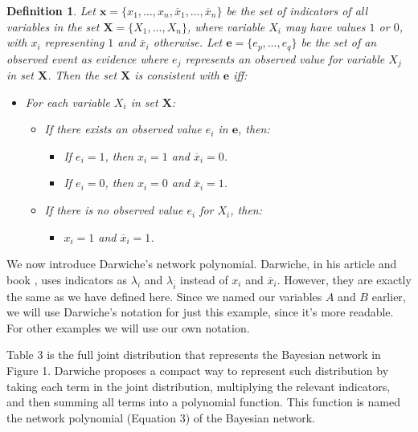 \documentclass[a4paper,10pt]{article}
\theoremstyle{plain}
\newtheorem*{spn-def}{Definition}
\begin{document}
\begin{spn-def}
  Let $\mathbf{x}=\{x_1,\ldots,x_n,\overline{x}_1,\ldots,\overline{x}_n\}$ be the set of indicators
  of all variables in the set $\mathbf{X}=\{X_1,\ldots,X_n\}$, where variable $X_i$ may have values
  $1$ or $0$, with $x_i$ representing $1$ and $\overline{x}_i$ otherwise. Let $\mathbf{e}=\{e_p,
  \ldots,e_q\}$ be the set of an observed event as evidence where $e_j$ represents an observed
  value for variable $X_j$ in set $\mathbf{X}$. Then the set $\mathbf{X}$ is consistent with
  $\mathbf{e}$ iff:

  \begin{itemize}
    \item For each variable $X_i$ in set $\mathbf{X}$:
      \begin{itemize}
        \item If there exists an observed value $e_i$ in $\mathbf{e}$, then:
        \begin{itemize}
          \item If $e_i=1$, then $x_i=1$ and $\overline{x}_i=0$.
          \item If $e_i=0$, then $x_i=0$ and $\overline{x}_i=1$.
        \end{itemize}
        \item If there is no observed value $e_i$ for $X_i$, then:
        \begin{itemize}
          \item $x_i=1$ and $\overline{x}_i=1$.
        \end{itemize}
      \end{itemize}
  \end{itemize}
\end{spn-def}

We now introduce Darwiche's network polynomial. Darwiche, in his article and book
\cite{diff-approach-darwiche,bayes-net-darwiche}, uses indicators as $\lambda_i$ and
$\lambda_{\overline{i}}$ instead of $x_i$ and $\overline{x}_i$. However, they are exactly the same
as we have defined here. Since we named our variables $A$ and $B$ earlier, we will use Darwiche's
notation for just this example, since it's more readable. For other examples we will use our own
notation.

Table 3 is the full joint distribution that represents the Bayesian network in Figure 1. Darwiche
proposes a compact way to represent such distribution by taking each term in the joint
distribution, multiplying the relevant indicators, and then summing all terms into a polynomial
function. This function is named the network polynomial (Equation 3) of the Bayesian network.
\end{document}
